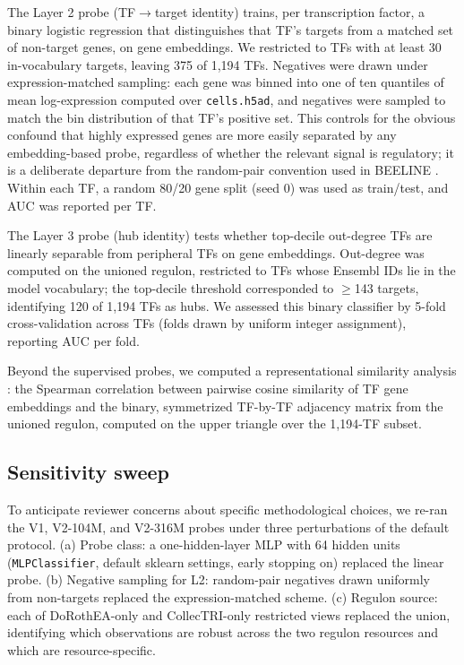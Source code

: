 \documentclass[
  11pt,
]{article}
\begin{document}
The Layer 2 probe (TF$\to$target identity) trains, per transcription factor,
a binary logistic regression that distinguishes that TF's targets from a
matched set of non-target genes, on gene embeddings. We restricted to
TFs with at least 30 in-vocabulary targets, leaving 375 of 1,194 TFs.
Negatives were drawn under expression-matched sampling: each gene was
binned into one of ten quantiles of mean log-expression computed over
\texttt{cells.h5ad}, and negatives were sampled to match the bin
distribution of that TF's positive set. This controls for the obvious
confound that highly expressed genes are more easily separated by any
embedding-based probe, regardless of whether the relevant signal is
regulatory; it is a deliberate departure from the random-pair convention
used in BEELINE \citep{pratapa2020beeline}. Within each TF, a random 80/20
gene split (seed 0) was used as train/test, and AUC was reported per TF.

The Layer 3 probe (hub identity) tests whether top-decile out-degree TFs
are linearly separable from peripheral TFs on gene embeddings.
Out-degree was computed on the unioned regulon, restricted to TFs whose
Ensembl IDs lie in the model vocabulary; the top-decile threshold
corresponded to $\geq$143 targets, identifying 120 of 1,194 TFs as hubs. We
assessed this binary classifier by 5-fold cross-validation across TFs
(folds drawn by uniform integer assignment), reporting AUC per fold.

Beyond the supervised probes, we computed a representational similarity
analysis \citep{kriegeskorte2008rsa}: the Spearman correlation between
pairwise cosine similarity of TF gene embeddings and the binary,
symmetrized TF-by-TF adjacency matrix from the unioned regulon, computed
on the upper triangle over the 1,194-TF subset.

\subsection{Sensitivity sweep}\label{sensitivity-sweep}

To anticipate reviewer concerns about specific methodological choices,
we re-ran the V1, V2-104M, and V2-316M probes under three perturbations
of the default protocol. (a) Probe class: a one-hidden-layer MLP with 64
hidden units (\texttt{MLPClassifier}, default sklearn settings, early
stopping on) replaced the linear probe. (b) Negative sampling for L2:
random-pair negatives drawn uniformly from non-targets replaced the
expression-matched scheme. (c) Regulon source: each of DoRothEA-only and
CollecTRI-only restricted views replaced the union, identifying which
observations are robust across the two regulon resources and which are
resource-specific.
\end{document}
